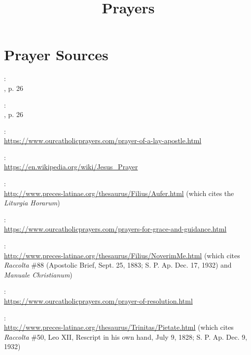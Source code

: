 \documentclass[12pt]{article}
\newcommand{\emphasis}[1]{\emph{#1}}
\newcommand{\emphasis}[1]{\textsl{#1}}
\newcommand{\foreign}[1]{\emphasis{#1}}
\begin{document}
\title{\textbf{Prayers}\date{\vspace{-10ex}}}\maketitle
\tableofcontents\newpage



















\appendix


\section{Prayer Sources}
\newcommand{\urlsource}[1]{:\\{\footnotesize\url{#1}}}

:\\
, p. 26

:\\
, p. 26

\urlsource{https://www.ourcatholicprayers.com/prayer-of-a-lay-apostle.html}

\urlsource{https://en.wikipedia.org/wiki/Jesus_Prayer}

\urlsource{http://www.preces-latinae.org/thesaurus/Filius/Aufer.html} (which cites the \foreign{Liturgia Horarum})

\urlsource{https://www.ourcatholicprayers.com/prayers-for-grace-and-guidance.html}

\urlsource{http://www.preces-latinae.org/thesaurus/Filius/NoverimMe.html} (which cites \foreign{Raccolta} \#88 (Apostolic Brief, Sept. 25, 1883; S. P. Ap. Dec. 17, 1932) and \foreign{Manuale Christianum})

\urlsource{https://www.ourcatholicprayers.com/prayer-of-resolution.html}

\urlsource{http://www.preces-latinae.org/thesaurus/Trinitas/Pietate.html} (which cites \foreign{Raccolta} \#50, Leo XII, Rescript in his own hand, July 9, 1828; S. P. Ap. Dec. 9, 1932)
\end{document}
